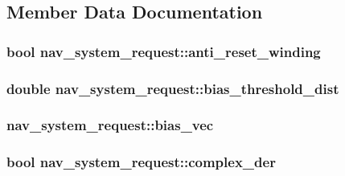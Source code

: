 \subsection{Member Data Documentation}
\hypertarget{structnav__system__request_a8d92b7152b52f5242bd2530e5a78e595}{
\subsubsection[{anti\-\_\-reset\-\_\-winding}]{\setlength{\rightskip}{0pt plus 5cm}bool nav\-\_\-system\-\_\-request\-::anti\-\_\-reset\-\_\-winding}}\label{structnav__system__request_a8d92b7152b52f5242bd2530e5a78e595}
\hypertarget{structnav__system__request_a98b66505eb818bc1b8b0589629db6774}{
\subsubsection[{bias\-\_\-threshold\-\_\-dist}]{\setlength{\rightskip}{0pt plus 5cm}double nav\-\_\-system\-\_\-request\-::bias\-\_\-threshold\-\_\-dist}}\label{structnav__system__request_a98b66505eb818bc1b8b0589629db6774}
\hypertarget{structnav__system__request_a566b2891814edabd1e6d73fc2317a016}{
\subsubsection[{bias\-\_\-vec}]{ nav\-\_\-system\-\_\-request\-::bias\-\_\-vec}}\label{structnav__system__request_a566b2891814edabd1e6d73fc2317a016}
\hypertarget{structnav__system__request_abbf882832304276ef120aef92e62d011}{
\subsubsection[{complex\-\_\-der}]{\setlength{\rightskip}{0pt plus 5cm}bool nav\-\_\-system\-\_\-request\-::complex\-\_\-der}}\label{structnav__system__request_abbf882832304276ef120aef92e62d011}
